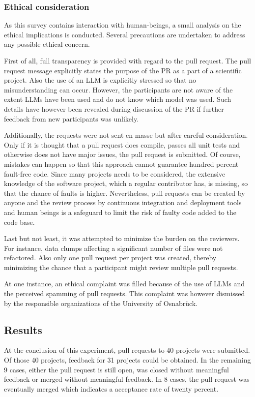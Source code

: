\subsubsection{Ethical consideration}
As this survey contains interaction with human-beings, a small analysis on the ethical implications is conducted. Several precautions are undertaken to address any possible ethical concern. 

First of all, full transparency is provided  with regard to the pull request. The pull request message explicitly states the purpose of the PR as a part of a scientific project. Also the use of an \ac{LLM} is explicitly stressed so that no misunderstanding can occur. However, the participants are not aware of the extent \acp{LLM} have been used and do not know which model was used. Such details have however been revealed during discussion of the PR if further feedback from new participants was unlikely.

Additionally, the requests were not sent en masse but after careful consideration. Only if it is thought that a pull request does compile, passes all unit tests and otherwise does not have major issues, the pull request is submitted. Of course, mistakes can happen so that this approach cannot guarantee hundred percent fault-free code. Since many projects needs to be considered, the extensive knowledge of the software project, which a regular contributor has, is missing, so that the chance of faults is higher. Nevertheless, pull requests can be created by anyone and the review process by continuous integration and deployment tools and human beings is a safeguard to limit the risk of faulty code added to the code base. 

Last but not least, it was attempted to minimize the burden on the reviewers. For instance, data clumps affecting a significant number of files were not refactored. Also only one pull request per project was created, thereby minimizing the chance that a participant might review multiple pull requests. 

At one instance, an ethical complaint was filled because of the use of \acp{LLM} and the perceived spamming of pull requests. This complaint was however dismissed by the responsible organizations of the University of Osnabrück.


\subsection{Results}

At the conclusion of this experiment, pull requests to 40 projects were submitted. Of those 40 projects,  feedback for 31 projects could be obtained. In the remaining 9 cases, either the pull request is still open, was closed without meaningful feedback or merged without meaningful feedback. In 8 cases, the pull request was eventually merged which indicates a acceptance rate of twenty percent. 

